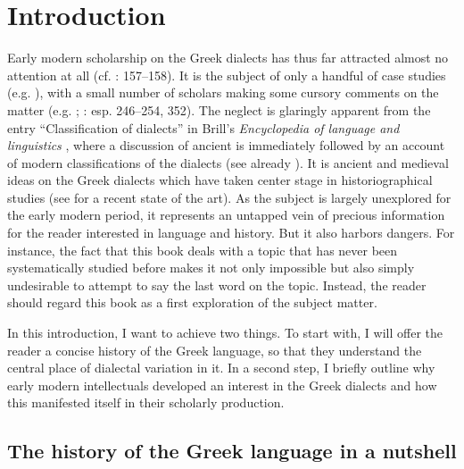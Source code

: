 \chapter{Introduction}\label{chap:1}

Early modern scholarship on the Greek dialects has thus far attracted almost no attention at all (cf. \citealt{Ben-Tov2009}: 157–158). It is the subject of only a handful of case studies (e.g. \citealt{VanRooy2016c}), with a small number of scholars making some cursory comments on the matter (e.g. \citealt{Botley2010}; \citealt{Roelcke2014}: esp. 246–254, 352). The neglect is glaringly apparent from the entry “Classification of dialects” in Brill’s \textit{Encyclopedia of  language and linguistics} \citep{Finkelberg2014}, where a discussion of ancient  is immediately followed by an account of modern classifications of the dialects (see already \citealt{VanRooy2016a}). It is ancient and medieval ideas on the Greek dialects which have taken center stage in historiographical studies (see \citealt{VanRooy2018b} for a recent state of the art). As the subject is largely unexplored for the early modern period, it represents an untapped vein of precious information for the reader interested in language and history. But it also harbors dangers. For instance, the fact that this book deals with a topic that has never been systematically studied before makes it not only impossible but also simply undesirable to attempt to say the last word on the topic. Instead, the reader should regard this book as a first exploration of the subject matter.

In this introduction, I want to achieve two things. To start with, I will offer the reader a concise history of the Greek language, so that they understand the central place of dialectal variation in it. In a second step, I briefly outline why early modern intellectuals developed an interest in the Greek dialects and how this manifested itself in their scholarly production.

\section{The history of the Greek language in a nutshell}\label{sec:1.1}

